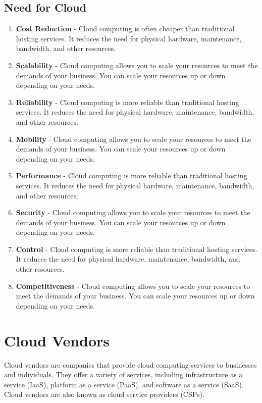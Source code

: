 \documentclass[11pt]{article}
\begin{document}
\subsection{Need for Cloud}
\begin{enumerate}
    \item \textbf{Cost Reduction} - Cloud computing is often cheaper than traditional hosting services. It reduces the need for physical hardware, maintenance, bandwidth, and other resources.
    \item \textbf{Scalability} - Cloud computing allows you to scale your resources to meet the demands of your business. You can scale your resources up or down depending on your needs.
    \item \textbf{Reliability} - Cloud computing is more reliable than traditional hosting services. It reduces the need for physical hardware, maintenance, bandwidth, and other resources.
    \item \textbf{Mobility} - Cloud computing allows you to scale your resources to meet the demands of your business. You can scale your resources up or down depending on your needs.
    \item \textbf{Performance} - Cloud computing is more reliable than traditional hosting services. It reduces the need for physical hardware, maintenance, bandwidth, and other resources.
    \item \textbf{Security} - Cloud computing allows you to scale your resources to meet the demands of your business. You can scale your resources up or down depending on your needs.
    \item \textbf{Control} - Cloud computing is more reliable than traditional hosting services. It reduces the need for physical hardware, maintenance, bandwidth, and other resources.
    \item \textbf{Competitiveness} - Cloud computing allows you to scale your resources to meet the demands of your business. You can scale your resources up or down depending on your needs.
\end{enumerate}

\section{Cloud Vendors}

Cloud vendors are companies that provide cloud computing services to businesses and individuals. They offer a variety of services, including infrastructure as a service (IaaS), platform as a service (PaaS), and software as a service (SaaS). Cloud vendors are also known as cloud service providers (CSPs).
\end{document}
